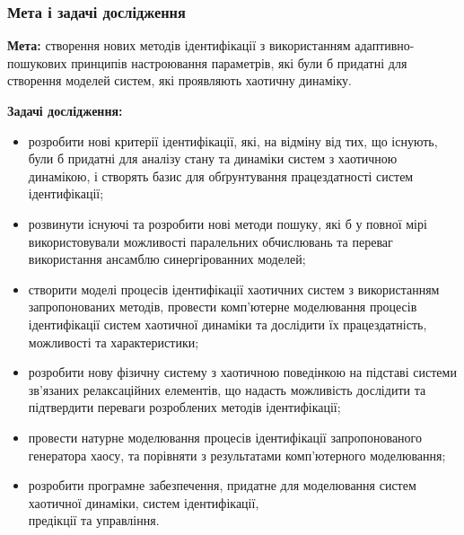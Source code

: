 \documentclass[14pt,handout,utf8]{beamer}
\begin{document}
\begin{frame}
  \frametitle{Мета і задачі дослідження}

\textbf{Мета:} створення нових методів ідентифікації з
використанням адаптивно-пошукових принципів настроювання параметрів, які
були б придатні для створення моделей систем, які проявляють хаотичну динаміку.

\vfill

\textbf{Задачі дослідження:}
  \begin{itemize}

    \item \justifying
      розробити нові критерії ідентифікації, які, на відміну від тих, що
      існують, були б придатні для аналізу стану та динаміки
      систем з хаотичною динамікою, і створять базис для обґрунтування працездатності систем
      ідентифікації;

    \item \justifying
      розвинути існуючі та розробити нові методи пошуку, які б
      у повної мірі використовували можливості
      паралельних обчислювань та переваг використання ансамблю
      синергірованних моделей;

    \item \justifying
      створити моделі процесів
      ідентифікації хаотичних систем з використанням запропонованих методів,
      провести комп'ю\-терне моделювання процесів ідентифікації систем
      хаотичної динаміки та дослідити їх працездатність, можливості та
      характеристики;

    \item \justifying
      розробити нову фізичну систему з хаотичною поведінкою
      на підставі системи зв'язаних релаксаційних елементів,
      що надасть можливість дослідити та підтвердити переваги
      розроблених методів ідентифікації;

    \item \justifying
      провести натурне моделювання процесів ідентифікації запропонованого
      генератора хаосу, та порівняти з результатами комп'ютерного моделювання;

    \item \justifying
      розробити програмне забезпечення, придатне для моделювання систем
      хаотичної динаміки, систем ідентифікації,\\
      предікції та управління.

\end{itemize}


\end{frame}
\end{document}
